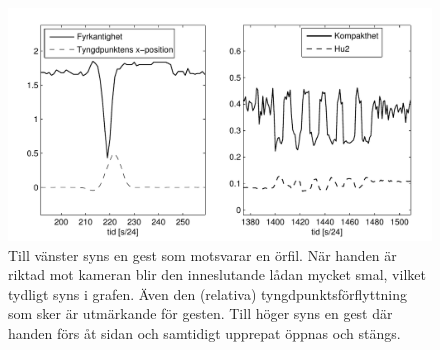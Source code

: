 \documentclass[../rapport_MVEX01-11-05]{subfiles}
\begin{document}
\begin{figure}[hb]
    \begin{center}
        \includegraphics[width=\columnwidth]{bilder/motion}
    \end{center}
    \caption{Till vänster syns en gest som motsvarar en örfil.
    När handen är riktad mot kameran blir den inneslutande
    lådan mycket smal, vilket tydligt syns i grafen.
    Även den (relativa) tyngdpunktsförflyttning som sker är utmärkande för
    gesten.
     Till höger syns en gest där handen förs åt sidan och samtidigt
    upprepat öppnas och stängs.}
    \label{fig:motion}
\end{figure}
\end{document}
